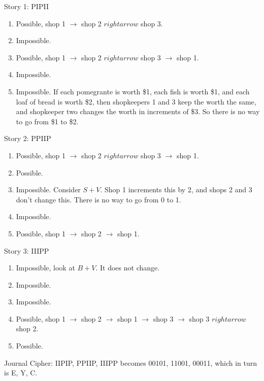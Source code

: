Story 1:  PIPII \begin{enumerate} \item Possible, shop 1 \(\rightarrow\) shop 2 \(rightarrow\) shop 3.  \item Impossible.  \item Possible, shop 1 \(\rightarrow\) shop 2 \(rightarrow\) shop 3 \(\rightarrow\) shop 1.  \item Impossible.  \item Impossible. If each pomegrante is worth \$1, each fish is worth \$1, and each loaf of bread is worth \$2, then shopkeepers 1 and 3 keep the worth the same, and shopkeeper two changes the worth in increments of \$3. So there is no way to go from \$1 to \$2.  \end{enumerate} Story 2: PPIIP \begin{enumerate} \item Possible, shop 1 \(\rightarrow\) shop 2 \(rightarrow\) shop 3 \(\rightarrow\) shop 1.  \item Possible.  \item Impossible. Consider \(S + V\). Shop 1 increments this by 2, and shops 2 and 3 don't change this. There is no way to go from 0 to 1.  \item Impossible.  \item Possible, shop 1 \(\rightarrow\) shop 2 \(\rightarrow\) shop 1.
\end{enumerate}

Story 3: IIIPP
\begin{enumerate}
\item Impossible, look at \(B + V\). It does not change.
\item Impossible.
\item Impossible.
\item Possible, shop 1 \(\rightarrow\) shop 2 \(\rightarrow\) shop 1 \(\rightarrow\) shop 3 \(\rightarrow\) shop 3 \(rightarrow\) shop 2.
\item Possible.
\end{enumerate}

Journal Cipher: IIPIP, PPIIP, IIIPP becomes 00101, 11001, 00011, which in turn is E, Y, C.
